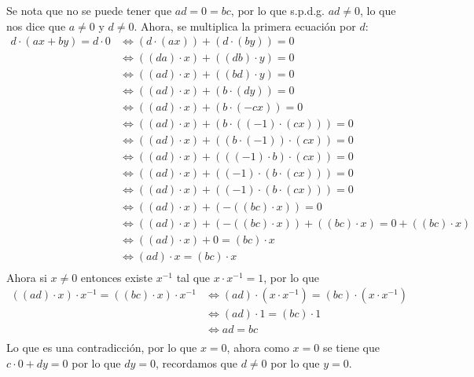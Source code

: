 \documentclass{ayudantia}
\begin{document}
\begin{ans}
    \begin{sol}
        Se nota que no se puede tener que \(ad=0=bc\), por lo que s.p.d.g. \(ad\neq0\), lo que nos dice que \(a\neq0\) y \(d\neq0\). Ahora, se multiplica la primera ecuación por \(d\):
        \begin{align*}
            d\cdot(ax+by)=d\cdot 0&\iff (d\cdot(ax))+(d\cdot(by))=0\\
            &\iff ((da)\cdot x)+((db)\cdot y)=0\\
            &\iff ((ad)\cdot x)+((bd)\cdot y)=0\\
            &\iff ((ad)\cdot x)+(b\cdot(dy))=0\\
            &\iff ((ad)\cdot x)+(b\cdot(-cx))=0\\
            &\iff ((ad)\cdot x)+(b\cdot((-1)\cdot(cx)))=0\\
            &\iff ((ad)\cdot x)+((b\cdot(-1))\cdot(cx))=0\\
            &\iff ((ad)\cdot x)+(((-1)\cdot b)\cdot(cx))=0\\
            &\iff ((ad)\cdot x)+((-1)\cdot (b\cdot(cx)))=0\\
            &\iff ((ad)\cdot x)+((-1)\cdot (b\cdot(cx)))=0\\
            &\iff ((ad)\cdot x)+(-((bc)\cdot x))=0\\
            &\iff ((ad)\cdot x)+(-((bc)\cdot x))+((bc)\cdot x)=0+((bc)\cdot x)\\
            &\iff ((ad)\cdot x)+0=(bc)\cdot x\\
            &\iff (ad)\cdot x=(bc)\cdot x\\
        \end{align*}
        Ahora si \(x\neq0\) entonces existe \(x^{-1}\) tal que \(x\cdot x^{-1}=1\), por lo que
        \begin{align*}
            ((ad)\cdot x)\cdot x^{-1}=((bc)\cdot x)\cdot x^{-1}&\iff (ad)\cdot (x\cdot x^{-1})=(bc)\cdot (x\cdot x^{-1})\\
            &\iff (ad)\cdot1=(bc)\cdot1\\
            &\iff ad=bc\\
        \end{align*}
        Lo que es una contradicción, por lo que \(x=0\), ahora como \(x=0\) se tiene que \(c\cdot 0+dy=0\) por lo que \(dy=0\), recordamos que \(d\neq0\) por lo que \(y=0\).
    \end{sol}
\end{ans}
\end{document}
